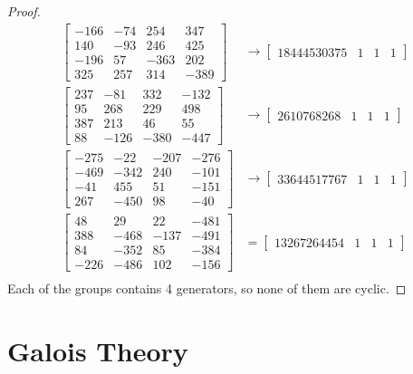 \documentclass[12pt, psamsfonts]{amsart}
\theoremstyle{definition}
\theoremstyle{remark}
\numberwithin{equation}{section}
\begin{document}
\begin{proof}
  \begin{align*}
    \begin{bmatrix} -166 & -74 & 254 & 347\\ 140 & -93 & 246 & 425\\ -196 & 57 & -363 & 202\\ 325 & 257 & 314 & -389 \end{bmatrix}
      &\rightarrow \begin{bmatrix} 18444530375 & 1 & 1 & 1 \end{bmatrix} \\
    \begin{bmatrix} 237 & -81 & 332 & -132\\ 95 & 268 & 229 & 498\\ 387 & 213 & 46 & 55\\ 88 & -126 & -380 & -447 \end{bmatrix}
      &\rightarrow \begin{bmatrix} 2610768268 & 1 & 1 & 1 \end{bmatrix} \\
    \begin{bmatrix} -275 & -22 & -207 & -276\\ -469 & -342 & 240 & -101\\ -41 & 455 & 51 & -151\\ 267 & -450 & 98 & -40 \end{bmatrix}
      &\rightarrow \begin{bmatrix} 33644517767 & 1 & 1 & 1 \end{bmatrix} \\
    \begin{bmatrix} 48 & 29 & 22 & -481\\ 388 & -468 & -137 & -491\\ 84 & -352 & 85 & -384\\ -226 & -486 & 102 & -156 \end{bmatrix}
       &= \begin{bmatrix} 13267264454 & 1 & 1 & 1 \end{bmatrix} \\
  \end{align*}
  Each of the groups contains 4 generators, so none of them are cyclic.
\end{proof}

\section{Galois Theory}
\end{document}
